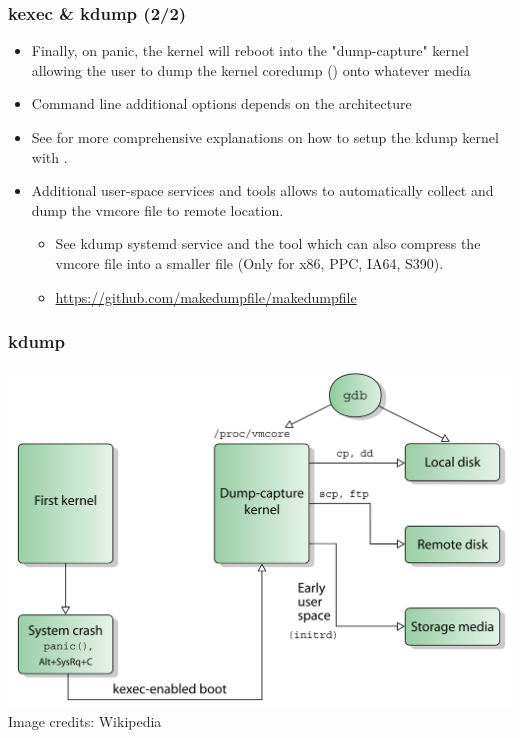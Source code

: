 \begin{frame}
  \frametitle{kexec \& kdump (2/2)}
  \begin{itemize}
    \item Finally, on panic, the kernel will reboot into the "dump-capture"
      kernel allowing the user to dump the kernel coredump ()
      onto whatever media  
    \item Command line additional options depends on the architecture
    \item See  for more comprehensive
      explanations on how to setup the kdump kernel with .
    \item Additional user-space services and tools allows to automatically
      collect and dump the vmcore file to remote location.
    \begin{itemize}
      \item See kdump systemd service and the  tool which
        can also compress the vmcore file into a smaller file (Only for x86,
        PPC, IA64, S390).
      \item \url{https://github.com/makedumpfile/makedumpfile}
    \end{itemize}
  \end{itemize}
\end{frame}

\begin{frame}
  \frametitle{kdump}
  \center\includegraphics[height=0.8\textheight]{slides/debugging-kernel-debugging/kdump.png}\\
  \tiny Image credits: Wikipedia
\end{frame}

